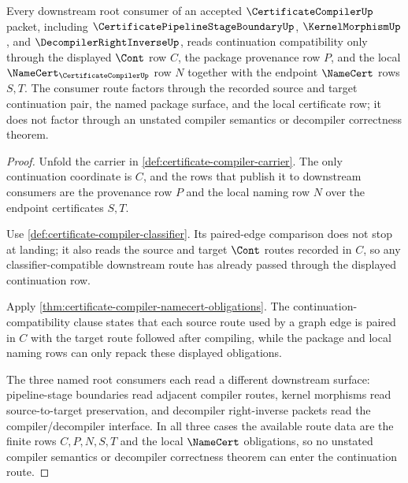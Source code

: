 \begin{theorem}
\label{thm:certificate-compiler-root-continuation-route-obligation}
Every downstream root consumer of an accepted $\CertificateCompilerUp$ packet,
including $\CertificatePipelineStageBoundaryUp$, $\KernelMorphismUp$, and
$\DecompilerRightInverseUp$, reads continuation compatibility only through the
displayed $\Cont$ row $C$, the package provenance row $P$, and the local
$\NameCert_{\CertificateCompilerUp}$ row $N$ together with the endpoint
$\NameCert$ rows $S,T$. The consumer route factors through the recorded source
and target continuation pair, the named package surface, and the local
certificate row; it does not factor through an unstated compiler semantics or
decompiler correctness theorem.
\end{theorem}
\begin{proof}
Unfold the carrier in \autoref{def:certificate-compiler-carrier}. The only
continuation coordinate is $C$, and the rows that publish it to downstream
consumers are the provenance row $P$ and the local naming row $N$ over the
endpoint certificates $S,T$.

Use \autoref{def:certificate-compiler-classifier}. Its paired-edge comparison
does not stop at landing; it also reads the source and target $\Cont$ routes
recorded in $C$, so any classifier-compatible downstream route has already
passed through the displayed continuation row.

Apply \autoref{thm:certificate-compiler-namecert-obligations}. The
continuation-compatibility clause states that each source route used by a
graph edge is paired in $C$ with the target route followed after compiling,
while the package and local naming rows can only repack these displayed
obligations.

The three named root consumers each read a different downstream surface:
pipeline-stage boundaries read adjacent compiler routes, kernel morphisms read
source-to-target preservation, and decompiler right-inverse packets read the
compiler/decompiler interface. In all three cases the available route data are
the finite rows $C,P,N,S,T$ and the local $\NameCert$ obligations, so no
unstated compiler semantics or decompiler correctness theorem can enter the
continuation route.
\end{proof}

